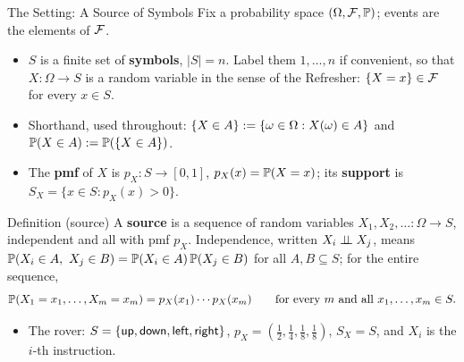 \begin{frame}{The Setting: A Source of Symbols}
  \small
  Fix a probability space $(\Omega,\mathcal{F},\mathbb{P})$; events are the elements of $\mathcal{F}$.
  \begin{itemize}
    \item $S$ is a finite set of \textbf{symbols}, $|S|=n$. Label them $1,\dots,n$ if convenient, so that $X\colon\Omega\to S$ is a random variable in the sense of the Refresher: $\{X=x\}\in\mathcal{F}$ for every $x\in S$.
    \item Shorthand, used throughout: $\{X\in A\}:=\{\omega\in\Omega : X(\omega)\in A\}$ and $\mathbb{P}(X\in A):=\mathbb{P}(\{X\in A\})$.
    \item The \textbf{pmf} of $X$ is $p_X\colon S\to[0,1]$, $p_X(x)=\mathbb{P}(X=x)$; its \textbf{support} is $S_X=\{x\in S: p_X(x)>0\}$.
  \end{itemize}
  \begin{block}{Definition (source)}
    A \textbf{source} is a sequence of random variables $X_1,X_2,\dots\colon\Omega\to S$, independent and all with pmf $p_X$. Independence, written $X_i\perp\!\!\!\perp X_j$, means
    $\mathbb{P}(X_i\in A,\ X_j\in B)=\mathbb{P}(X_i\in A)\,\mathbb{P}(X_j\in B)$ for all $A,B\subseteq S$; for the entire sequence,
    \[
      \mathbb{P}(X_1=x_1,\dots,X_m=x_m)=p_X(x_1)\cdots p_X(x_m)\qquad\text{for every $m$ and all } x_1,\dots,x_m\in S .
    \]
  \end{block}
  \begin{itemize}
    \item The rover: $S=\{\textsf{up},\textsf{down},\textsf{left},\textsf{right}\}$, $p_X=(\tfrac12,\tfrac14,\tfrac18,\tfrac18)$, $S_X=S$, and $X_i$ is the $i$-th instruction.
  \end{itemize}
\end{frame}

